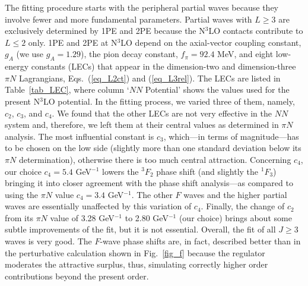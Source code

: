 \documentclass[sort&compress,preprint,3p]{elsarticle}
\begin{document}
The fitting procedure starts with 
the peripheral partial waves because they involve
fewer and more fundamental parameters.
Partial waves with $L\geq 3$
are exclusively determined by 1PE and 2PE because
the N$^3$LO contacts contribute to $L\leq 2$ only.
1PE and 2PE at N$^3$LO depend on
the axial-vector coupling constant, $g_A$ (we use $g_A=1.29$),
the pion decay constant, $f_\pi=92.4$ MeV,
and eight low-energy constants (LECs) that appear in the 
dimension-two and dimension-three $\pi N$ Lagrangians,
Eqs.~(\ref{eq_L2ct}) and (\ref{eq_L3rel}).
The LECs are listed in Table~\ref{tab_LEC},
where column `$NN$ Potential' shows the values
used for the present N$^3$LO potential.
In the fitting process,
we varied three of them, namely, $c_2$, $c_3$, and $c_4$.
We found that the other LECs are not very effective in the
$NN$ system and, therefore, we left them at their central
values as determined in $\pi N$ analysis.
The most influential constant is $c_3$, 
which---in terms of magnitude---has to be chosen
on the low side (slightly more than one standard deviation
below its $\pi N$ determination), otherwise there is
too much central attraction.
Concerning $c_4$, our choice $c_4 = 5.4$ GeV$^{-1}$ 
lowers the $^3F_2$ 
phase shift (and slightly the $^1F_3$) bringing it 
into closer agreement with the phase shift 
analysis---as compared to using the $\pi N$ value
$c_4=3.4$ GeV$^{-1}$. The other
$F$ waves and the higher partial waves are essentially unaffected
by this variation of $c_4$. 
Finally, the change of $c_2$ from its $\pi N$ value
of 3.28 GeV$^{-1}$ to 2.80 GeV$^{-1}$ (our choice)
brings about some subtle improvements of the fit, but
it is not essential.
Overall, the fit
of all $J\geq 3$ waves is very good.
The $F$-wave phase shifts are, in fact, described better
than in the perturbative calculation shown in Fig.~\ref{fig_f}
because the regulator moderates the attractive
surplus, thus, simulating correctly higher order
contributions beyond the present order.
\end{document}
